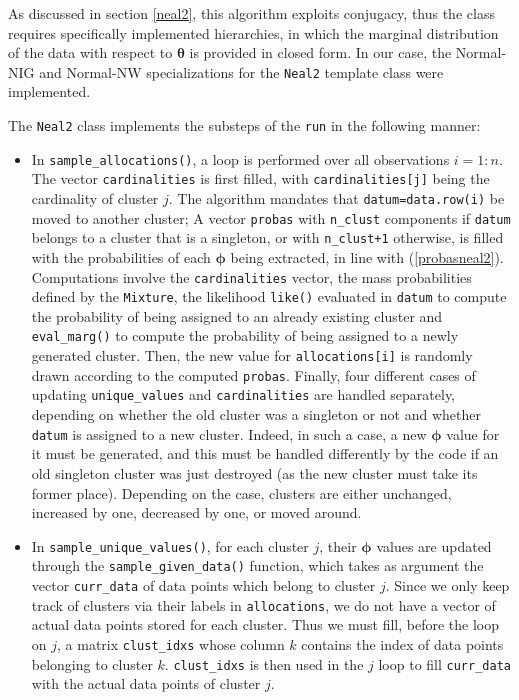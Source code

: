 As discussed in section \ref{neal2}, this algorithm exploits conjugacy, thus the class requires specifically implemented hierarchies, in which the marginal distribution of the data with respect to $\boldsymbol\theta$ is provided in closed form.
In our case, the Normal-NIG and Normal-NW specializations for the \verb|Neal2| template class were implemented.

The \verb|Neal2| class implements the substeps of the \verb|run| in the following manner:

\begin{itemize}

	\item In \verb|sample_allocations()|, a loop is performed over all observations $i=1:n$.
	The vector \verb|cardinalities| is first filled, with \verb|cardinalities[j]| being the cardinality of cluster $j$.
	The algorithm mandates that \verb|datum=data.row(i)| be moved to another cluster;
	A vector \verb|probas| with \verb|n_clust| components if \verb|datum| belongs to a cluster that is a singleton, or with \verb|n_clust+1| otherwise, is filled with the probabilities of each $\boldsymbol\phi$ being extracted, in line with (\ref{probasneal2}).
	Computations involve the \verb|cardinalities| vector, the mass probabilities defined by the \verb|Mixture|, the likelihood \verb|like()| evaluated in \verb|datum| to compute the probability of being assigned to an already existing cluster and \verb|eval_marg()| to compute the probability of being assigned to a newly generated cluster. Then, the new value for \verb|allocations[i]| is randomly drawn according to the computed \verb|probas|.
	Finally, four different cases of updating \verb|unique_values| and \verb|cardinalities| are handled separately, depending on whether the old cluster was a singleton or not and whether \verb|datum| is assigned to a new cluster.
	Indeed, in such a case, a new $\boldsymbol\phi$ value for it must be generated, and this must be handled differently by the code if an old singleton cluster was just destroyed (as the new cluster must take its former place).
	Depending on the case, clusters are either unchanged, increased by one, decreased by one, or moved around.
	
	\item In \verb|sample_unique_values()|, for each cluster $j$, their $\boldsymbol\phi$ values are updated through the \verb|sample_given_data()| function, which takes as argument the vector \verb|curr_data| of data points which belong to cluster $j$.
	Since we only keep track of clusters via their labels in \verb|allocations|, we do not have a vector of actual data points stored for each cluster.
	Thus we must fill, before the loop on $j$, a matrix \verb|clust_idxs| whose column $k$ contains the index of data points belonging to cluster $k$.
	\verb|clust_idxs| is then used in the $j$ loop to fill \verb|curr_data| with the actual data points of cluster $j$.

\end{itemize}


